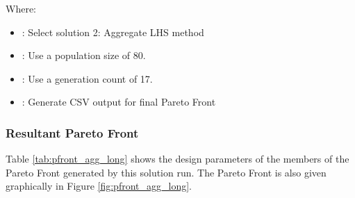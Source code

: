 \noindent Where: 

\begin{itemize}
  \item {}: Select solution 2: Aggregate LHS method
  \item {}: Use a population size of 80. 
  \item {}: Use a generation count of 17. 
  \item {}: Generate CSV output for final Pareto Front
\end{itemize}

\subsubsection{Resultant Pareto Front}
Table \ref{tab:pfront_agg_long} shows the design parameters of the members of the Pareto Front generated by this solution run. The Pareto Front is also given graphically in Figure \ref{fig:pfront_agg_long}. 

